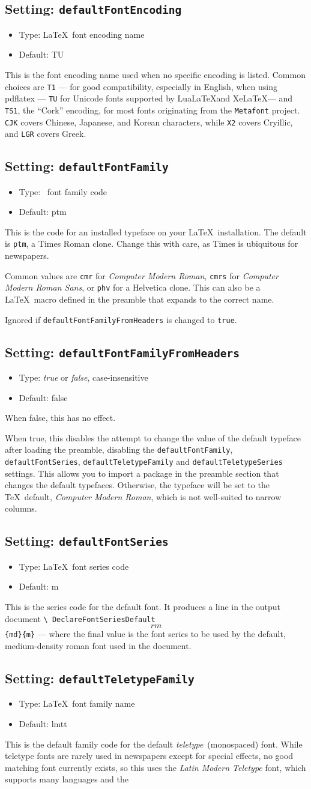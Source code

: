\documentclass[a4paper,DIV=11]{scrartcl}
\newcommand{\property}[5]{
  \subsection{#1: \texttt{#2}}
  \begin{itemize}
  \item Type: #3
  \item Default: #4
  \end{itemize}
  #5
}
\newcommand{\setting}{\property{Setting}}
\begin{document}
\begin{multicols}{2}
{}
\setting{defaultFontEncoding}{\LaTeX\ font encoding name}{TU}{This is
  the font encoding name used when no specific encoding is
  listed. Common choices are \texttt{T1} --- for good compatibility,
  especially in English, when using pdflatex --- \texttt{TU} for
  Unicode fonts supported by Lua\LaTeX and Xe\LaTeX ---
  and \texttt{TS1}, the ``Cork'' encoding, for most fonts originating from the
  \texttt{Metafont} project. \texttt{CJK} covers Chinese, Japanese, and Korean
  characters, while \texttt{X2} covers Cryillic, and \texttt{LGR}
  covers Greek.
}
\setting{defaultFontFamily}{\LaTeXe\ font family code}{ptm}{This is the code
  for an installed typeface on your \LaTeX\ installation. The default is
  \texttt{ptm}, a Times Roman clone. Change this with care, as
  Times is ubiquitous for newspapers.\par Common values are
  \texttt{cmr} for \textit{Computer Modern Roman}, \texttt{cmrs} for
  \textit{Computer Modern Roman Sans}, or \texttt{phv} for a Helvetica
  clone. This can also be a \LaTeX\ macro defined in the preamble that
  expands to the correct name.
  \par Ignored if \texttt{defaultFontFamilyFromHeaders} is changed to
  \texttt{true}.
}
\setting{defaultFontFamilyFromHeaders}{\textit{true} or \textit{false}, case-insensitive}{false}{
  When false, this has no effect.\par
  When true, this disables the attempt to change the value of the default
  typeface after loading the preamble, disabling the
  \texttt{defaultFontFamily}, \texttt{defaultFontSeries},
  \texttt{defaultTeletypeFamily} and \texttt{defaultTeletypeSeries}
  settings. This allows you to import a
  package in the preamble section that changes the default
  typefaces. Otherwise, the typeface will be set to the \TeX\ default,
  \textit{Computer Modern Roman}, which is not well-suited to narrow
  columns.
}
\setting{defaultFontSeries}{\LaTeX\ font series code}{m}{
  This is the series code for the default font. It produces a line in
  the output document \texttt{\textbackslash
    DeclareFontSeriesDefault\[rm\]\{md\}\{m\}} --- where the final
  value is the font series to be used by the default, medium-density
  roman font used in the document.
}
\setting{defaultTeletypeFamily}{\LaTeX\ font family name}{lmtt}{
  This is the default family code for the default
  \textit{teletype}~(monospaced) font. While teletype fonts are rarely
  used in newspapers except for special effects, no good matching
  font currently exists, so this uses the \textit{Latin Modern
    Teletype} font, which supports many languages and the
}
\end{multicols}
\end{document}
